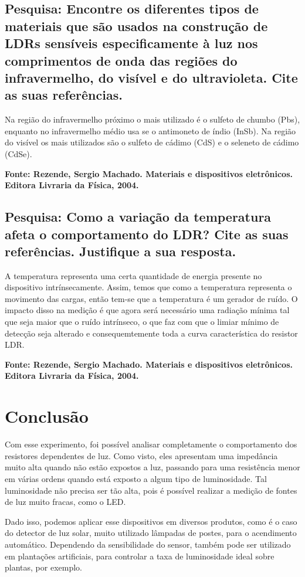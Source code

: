 \documentclass[12pt, onecolumn]{IEEEtran}
\begin{document}
\subsection{Pesquisa: Encontre os diferentes tipos de materiais que são usados na construção de LDRs sensíveis especificamente à luz nos comprimentos de onda das regiões do infravermelho, do visível e do ultravioleta. Cite as suas referências.}

Na região do infravermelho próximo o mais utilizado é o sulfeto de chumbo (Pbs), enquanto no infravermelho médio usa se o antimoneto de índio (InSb). Na região do visível os mais utilizados são o sulfeto de cádimo (CdS) e o seleneto de cádimo (CdSe).

\textbf{Fonte: Rezende, Sergio Machado. Materiais e dispositivos eletrônicos. Editora Livraria da Física, 2004.}

\subsection{Pesquisa: Como a variação da temperatura afeta o comportamento do LDR? Cite as suas referências. Justifique a sua resposta.}

A temperatura representa uma certa quantidade de energia presente no dispositivo intrínsecamente. Assim, temos que como a temperatura representa o movimento das cargas, então tem-se que a temperatura é um gerador de ruído. O impacto disso na medição é que agora será necessário uma radiação mínima tal que seja maior que o ruído intrínseco, o que faz com que o limiar mínimo de detecção seja alterado e consequemtemente toda a curva característica do resistor LDR. 

\textbf{Fonte: Rezende, Sergio Machado. Materiais e dispositivos eletrônicos. Editora Livraria da Física, 2004.}

\section{Conclusão}

Com esse experimento, foi possível analisar completamente o comportamento dos resistores dependentes de luz. Como visto, eles apresentam uma impedância muito alta quando não estão expostos a luz, passando para uma resistência menor em várias ordens quando está exposto a algum tipo de luminosidade. Tal luminosidade não precisa ser tão alta, pois é possível realizar a medição de fontes de luz muito fracas, como o LED.

Dado isso, podemos aplicar esse dispositivos em diversos produtos, como é o caso do detector de luz solar, muito utilizado lâmpadas de postes, para o acendimento automático. Dependendo da sensibilidade do sensor, também pode ser utilizado em plantações artificiais, para controlar a taxa de luminosidade ideal sobre plantas, por exemplo.
\end{document}
